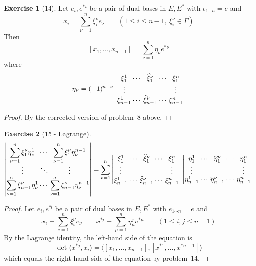 \documentclass[letterpaper,12pt]{article}
\newcommand{\delete}{\widehat}
\newcommand{\sprod}[2]{\langle#1,#2\rangle}
\theoremstyle{definition}
\newtheorem*{exer}{Exercise}
\theoremstyle{remark}
\begin{document}
\begin{exer}[14]
Let \(e_i,e^{*i}\) be a pair of dual bases in \(E,E^*\) with \(e_{1\cdots n}=e\) and
\[x_i=\sum_{\nu=1}^n\xi_i^{\nu}e_{\nu}\qquad(1\le i\le n-1,\ \xi_i^{\nu}\in\Gamma)\]
Then
\[[x_1,\ldots,x_{n-1}]=\sum_{\nu=1}^n\eta_{\nu}e^{*\nu}\]
where
\[\setlength\arraycolsep{1pt}
\eta_{\nu}=(-1)^{n-\nu}\begin{vmatrix}
\xi_1^1&\cdots&\delete{\xi}_1^{\nu}&\cdots&\xi_1^n\\
\vdots&&&&\vdots\\
\xi_{n-1}^1&\cdots&\delete{\xi}_{n-1}^{\nu}&\cdots&\xi_{n-1}^n
\end{vmatrix}\]
\end{exer}
\begin{proof}
By the corrected version of problem~8 above.
\end{proof}

\begin{exer}[15 - Lagrange]
\[\setlength\arraycolsep{1pt}
\begin{vmatrix}
\displaystyle\sum_{\nu=1}^n\xi_1^{\nu}\eta^1_{\nu}&\cdots&\displaystyle\sum_{\nu=1}^n\xi_1^{\nu}\eta^{n-1}_{\nu}\\
\vdots&\ddots&\vdots\\
\displaystyle\sum_{\nu=1}^n\xi_{n-1}^{\nu}\eta^1_{\nu}&\cdots&\displaystyle\sum_{\nu=1}^n\xi_{n-1}^{\nu}\eta^{n-1}_{\nu}
\end{vmatrix}=\sum_{\nu=1}^n\begin{vmatrix}
\xi_1^1&\cdots&\delete{\xi}_1^{\nu}&\cdots&\xi_1^n\\
\vdots&&&&\vdots\\
\xi_{n-1}^1&\cdots&\delete{\xi}_{n-1}^{\nu}&\cdots&\xi_{n-1}^n
\end{vmatrix}\begin{vmatrix}
\eta_1^1&\cdots&\delete{\eta}_1^{\nu}&\cdots&\eta_1^n\\
\vdots&&&&\vdots\\
\eta_{n-1}^1&\cdots&\delete{\eta}_{n-1}^{\nu}&\cdots&\eta_{n-1}^n
\end{vmatrix}
\]
\end{exer}
\begin{proof}
Let \(e_i,e^{*i}\) be a pair of dual bases in \(E,E^*\) with \(e_{1\cdots n}=e\) and
\[x_i=\sum_{\nu=1}^n\xi_i^{\nu}e_{\nu}\qquad x^{*j}=\sum_{\mu=1}^n\eta^j_{\mu}e^{*\mu}\qquad(1\le i,j\le n-1)\]
By the Lagrange identity, the left-hand side of the equation is
\[\det\sprod{x^{*j}}{x_i}=\sprod{[x_1,\ldots,x_{n-1}]}{[x^{*1},\ldots,x^{*n-1}]}\]
which equals the right-hand side of the equation by problem~14.
\end{proof}
\end{document}
